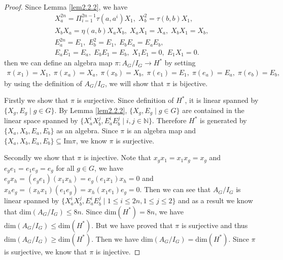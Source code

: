 \documentclass[a4paper,11pt]{amsart}
\numberwithin{equation}{section}
\begin{document}
\begin{proof}
Since Lemma \ref{lem2.2.2}, we have
\begin{gather*}
X_a^{2n}=\Pi_{i=1}^{2n-1}\tau(a,a^i)X_1,\;X_b^2=\tau(b,b)X_1,\\
X_bX_a=\eta(a,b)X_aX_b,\;X_a X_1=X_a,\;X_bX_1=X_b,\\
E_a^{2n}=E_1,\;E_b^2=E_1,\;E_bE_a=E_aE_b,\\
E_a E_1=E_a,\;E_b E_1=E_b,\;X_1 E_1=0,\;E_1X_1=0.
\end{gather*}
then we can define an algebra map $\pi:A_G/I_G\rightarrow H^*$ by setting
\begin{gather*}
\pi(x_1)=X_1,\; \pi(x_a)=X_a,\; \pi(x_b)=X_b,\; \pi(e_1)=E_1,\; \pi(e_a)=E_a,\; \pi(e_b)=E_b,
\end{gather*}
by using the definition of $A_G/I_G$, we will show that $\pi$ is bijective.

Firstly we show that $\pi$ is surjective. Since definition of $H^*$, it is linear spanned by $\{X_g,E_g\;|\;g\in G\}$. By Lemma \ref{lem2.2.2}, $\{X_g,E_g\;|\;g\in G\}$ are contained in the linear space spanned by $\{X_a^iX_b^j,E_a^iE_b^j\;|\;i,j\in \mathbb{N}\}$. Therefore $H^*$ is generated by $\{X_a,X_b,E_a,E_b\}$ as an algebra. Since $\pi$ is an algebra map and $\{X_a,X_b,E_a,E_b\}\subseteq \textrm{Im}\pi$, we know $\pi$ is surjective.

Secondly we show that $\pi$ is injective. Note that $x_g x_1=x_1x_g=x_g$ and $e_g e_1=e_1e_g=e_g$ for all $g\in G$, we have $e_gx_h=(e_g e_1)(x_1 x_h)=e_g(e_1 x_1)x_h=0$ and $x_he_g=( x_h x_1)(e_1 e_g )=x_h (x_1 e_1) e_g =0$. Then we can see that $A_G/I_G$ is linear spanned by $\{X_a^iX_b^j,E_a^iE_b^j\;|\;1\leq i \leq 2n, 1\leq j \leq 2\}$ and as a result we know that $\text{dim}(A_G/I_G)\leq 8n$. Since $\text{dim}(H^*)=8n$, we have $\text{dim}(A_G/I_G)\leq \text{dim}(H^*)$. But we have proved that $\pi$ is surjective and thus $\text{dim}(A_G/I_G)\geq \text{dim}(H^*)$. Then we have $\text{dim}(A_G/I_G)= \text{dim}(H^*)$. Since $\pi$ is surjective, we know that $\pi$  is injective.
\end{proof}
\end{document}
